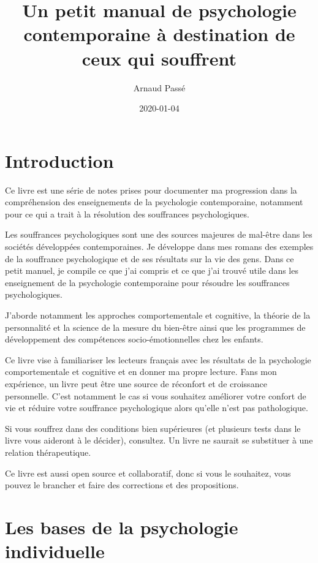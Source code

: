 \documentclass[]{book}
\title{Un petit manual de psychologie contemporaine à destination de ceux qui souffrent}
\author{Arnaud Passé}
\date{2020-01-04}
\begin{document}
\maketitle

{
\setcounter{tocdepth}{0}
\tableofcontents
}
\hypertarget{introduction}{%
\chapter*{Introduction}\label{introduction}}

Ce livre est une série de notes prises pour documenter ma progression dans la compréhension des enseignements de la psychologie contemporaine, notamment pour ce qui a trait à la résolution des souffrances psychologiques.

Les souffrances psychologiques sont une des sources majeures de mal-être dans les sociétés développées contemporaines.
Je développe dans mes romans des exemples de la souffrance psychologique et de ses résultats sur la vie des gens.
Dans ce petit manuel, je compile ce que j'ai compris et ce que j'ai trouvé utile dans les enseignement de la psychologie contemporaine pour résoudre les souffrances psychologiques.

J'aborde notamment les approches comportementale et cognitive, la théorie de la personnalité et la science de la mesure du bien-être ainsi que les programmes de développement des compétences socio-émotionnelles chez les enfants.

Ce livre vise à familiariser les lecteurs français avec les résultats de la psychologie comportementale et cognitive et en donner ma propre lecture.
Fans mon expérience, un livre peut être une source de réconfort et de croissance personnelle.
C'est notamment le cas si vous souhaitez améliorer votre confort de vie et réduire votre souffrance psychologique alors qu'elle n'est pas pathologique.

Si vous souffrez dans des conditions bien supérieures (et plusieurs tests dans le livre vous aideront à le décider), consultez.
Un livre ne saurait se substituer à une relation thérapeutique.

Ce livre est aussi open source et collaboratif, donc si vous le souhaitez, vous pouvez le brancher et faire des corrections et des propositions.

\hypertarget{les-bases-de-la-psychologie-individuelle}{%
\chapter{Les bases de la psychologie individuelle}\label{les-bases-de-la-psychologie-individuelle}}
\end{document}
